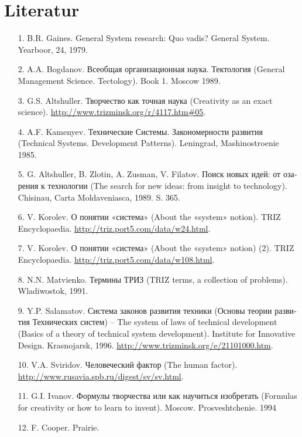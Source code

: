 \documentclass[11pt,a4paper]{article}
\begin{document}
\section*{Literatur}
\begin{itemize}
\item[1.] B.R. Gaines. General System research: Quo vadis? General System.
  Yearboor, 24, 1979.
\item[2.] A.A. Bogdanov. \foreignlanguage{russian}{Всеобщая организационная
  наука. Тектология} (General Management Science. Tectology). Book 1.  Moscow
  1989.
\item[3.] G.S. Altshuller. \foreignlanguage{russian}{Творчество как точная
  наука} (Creativity as an exact science).
  \url{http://www.trizminsk.org/r/4117.htm#05}.
\item[4.] A.F. Kamenyev. \foreignlanguage{russian}{Технические
  Системы. Закономерности развития} (Technical Systems. Development Patterns).
  Leningrad, Mashinostroenie 1985.
\item[5.] G. Altshuller, B. Zlotin, A. Zusman, V. Filatov.
  \foreignlanguage{russian}{Поиск новых идей: от озарения к технологии} (The
  search for new ideas: from insight to technology). Chisinau, Carta
  Moldaveniasca, 1989. S. 365.
\item[6.] V. Korolev. \foreignlanguage{russian}{О понятии «система»} (About
  the «system» notion). TRIZ Encyclopaedia.
  \url{http://triz.port5.com/data/w24.html}.
\item[7.] V. Korolev. \foreignlanguage{russian}{О понятии «система»} (About
  the «system» notion) (2).  TRIZ Encyclopaedia.
  \url{http://triz.port5.com/data/w108.html}.
\item[8.] N.N. Matvienko. \foreignlanguage{russian}{Термины ТРИЗ} (TRIZ terms,
  a collection of problems). Wladiwostok, 1991.
\item[9.] Y.P. Salamatov. \foreignlanguage{russian}{Система законов развития
  техники (Основы теории развития Технических систем)} -- The system of laws
  of technical development (Basics of a theory of technical system
  development).  Institute for Innovative Design. Krasnojarsk, 1996.
  \url{http://www.trizminsk.org/e/21101000.htm}.
\item[10.] V.A. Sviridov. \foreignlanguage{russian}{Человеческий фактор} (The
  human factor).  \url{http://www.rusavia.spb.ru/digest/sv/sv.html}.
\item[11.] G.I. Ivanov. \foreignlanguage{russian}{Формулы творчества или как
  научиться изобретать} (Formulas for creativity or how to learn to invent).
  Moscow. Prosveshtchenie. 1994
\item[12.] F. Cooper. Prairie. 
\end{itemize}
\end{document}
